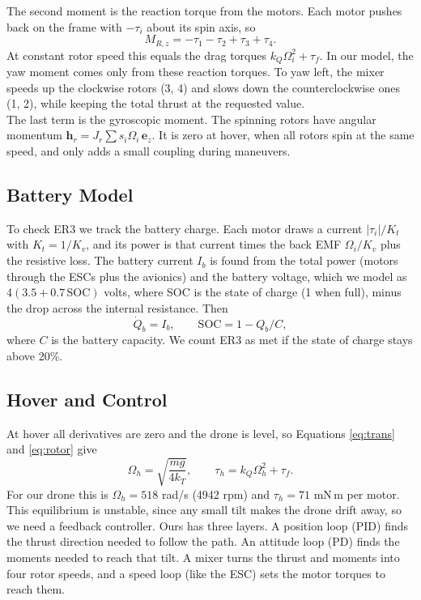 \documentclass[11pt]{article}
\begin{document}
The second moment is the reaction torque from the motors. Each motor pushes back on the frame with $-\tau_i$ about its spin axis, so
\begin{equation}
M_{R,z} = -\tau_1 - \tau_2 + \tau_3 + \tau_4 .
\end{equation}
At constant rotor speed this equals the drag torques $k_Q\Omega_i^2 + \tau_f$. In our model, the yaw moment comes only from these reaction torques. To yaw left, the mixer speeds up the clockwise rotors (3, 4) and slows down the counterclockwise ones (1, 2), while keeping the total thrust at the requested value.\\
The last term is the gyroscopic moment. The spinning rotors have angular momentum $\mathbf{h}_r = J_r \sum s_i\Omega_i\,\mathbf{e}_z$. It is zero at hover, when all rotors spin at the same speed, and only adds a small coupling during maneuvers.

\subsection{Battery Model}
To check ER3 we track the battery charge. Each motor draws a current $|\tau_i|/K_t$ with $K_t = 1/K_v$, and its power is that current times the back EMF $\Omega_i/K_v$ plus the resistive loss. The battery current $I_b$ is found from the total power (motors through the ESCs plus the avionics) and the battery voltage, which we model as $4(3.5 + 0.7\,\mathrm{SOC})$ volts, where SOC is the state of charge (1 when full), minus the drop across the internal resistance. Then
\begin{equation}
\dot Q_b = I_b, \qquad \mathrm{SOC} = 1 - Q_b/C,
\end{equation}
where $C$ is the battery capacity. We count ER3 as met if the state of charge stays above 20\%. 

\subsection{Hover and Control}
At hover all derivatives are zero and the drone is level, so Equations \eqref{eq:trans} and \eqref{eq:rotor} give
\begin{equation}
\Omega_h = \sqrt{\frac{mg}{4k_T}}, \qquad \tau_h = k_Q\Omega_h^2 + \tau_f .
\end{equation}
For our drone this is $\Omega_h = 518$ rad/s (4942 rpm) and $\tau_h = 71$ mN\,m per motor. This equilibrium is unstable, since any small tilt makes the drone drift away, so we need a feedback controller. Ours has three layers. A position loop (PID) finds the thrust direction needed to follow the path. An attitude loop (PD) finds the moments needed to reach that tilt. A mixer turns the thrust and moments into four rotor speeds, and a speed loop (like the ESC) sets the motor torques to reach them.
\end{document}
